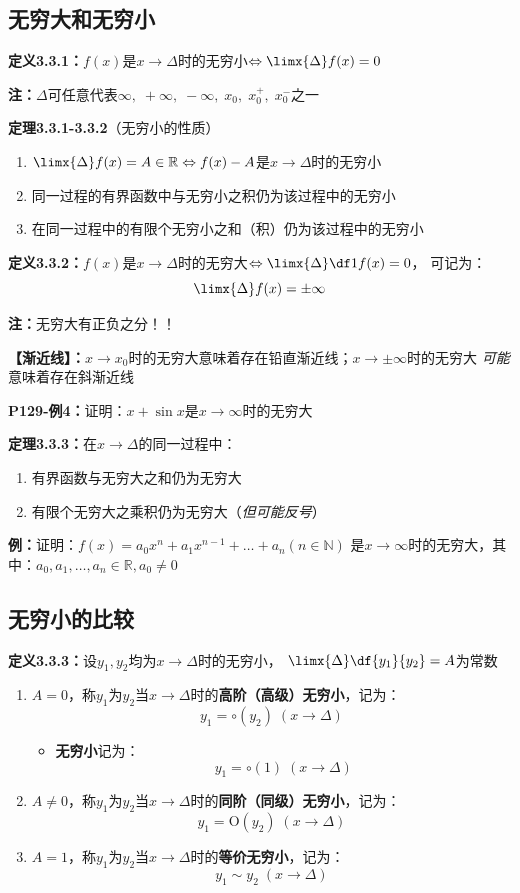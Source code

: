\subsection{无穷大和无穷小}

{\bf 定义3.3.1：}$f(x)$是$x\to\Delta$时的无穷小$\Leftrightarrow\limx{\Delta}f(x)=0$

{\bf 注：}$\Delta$可任意代表$\infty,\;+\infty,\;-\infty,\;x_0,\;x_0^+,\;x_0^-$之一

{\bf 定理3.3.1-3.3.2}（无穷小的性质）
\begin{enumerate}[(1)]
  \setlength{\itemindent}{1cm}
  \item $\limx{\Delta}f(x)=A\in\mathbb{R}\Leftrightarrow
  f(x)-A$是$x\to\Delta$时的无穷小
  \item 同一过程的有界函数中与无穷小之积仍为该过程中的无穷小
  \item 在同一过程中的有限个无穷小之和（积）仍为该过程中的无穷小
\end{enumerate}

{\bf 定义3.3.2：}$f(x)$是$x\to\Delta$时的无穷大$\Leftrightarrow\limx{\Delta}\df 1{f(x)}=0$，
可记为：
$$\limx{\Delta}f(x)=\pm\infty$$

{\bf 注：}无穷大有正负之分！！

{\bf 【渐近线】：}$x\to x_0$时的无穷大意味着存在铅直渐近线；$x\to\pm\infty$时的无穷大
{\it 可能}意味着存在斜渐近线

{\bf P129-例4：}证明：$x+\sin x$是$x\to\infty$时的无穷大

{\bf 定理3.3.3：}在$x\to\Delta$的同一过程中：
\begin{enumerate}[(1)]
  \setlength{\itemindent}{1cm}
  \item 有界函数与无穷大之和仍为无穷大
  \item 有限个无穷大之乘积仍为无穷大（{\it 但可能反号}）
\end{enumerate}

{\bf 例：}证明：$f(x)=a_0x^n+a_1x^{n-1}+\ldots+a_n(n\in\mathbb{N})$
是$x\to\infty$时的无穷大，其中：$a_0,a_1,\ldots,a_n\in\mathbb{R},a_0\ne 0$

\subsection{无穷小的比较}

{\bf 定义3.3.3：}设$y_1,y_2$均为$x\to\Delta$时的无穷小，
$\limx{\Delta}\df{y_1}{y_2}=A$为常数
\begin{enumerate}[(1)]
  \setlength{\itemindent}{1cm}
  \item $A=0$，称$y_1$为$y_2$当$x\to\Delta$时的{\bf 高阶（高级）无穷小}，记为：
  $$y_1=\circ( y_2)\;(x\to\Delta)$$
  \begin{itemize}
    \item {\bf 无穷小}记为：
    $$y_1=\circ(1)\;(x\to\Delta)$$
  \end{itemize}
  \item $A\ne 0$，称$y_1$为$y_2$当$x\to\Delta$时的{\bf 同阶（同级）无穷小}，记为：
  $$y_1=\mathrm{O}( y_2)\;(x\to\Delta)$$
  \item $A=1$，称$y_1$为$y_2$当$x\to\Delta$时的{\bf 等价无穷小}，记为：
  $$y_1\sim y_2\;(x\to\Delta)$$
\end{enumerate}

